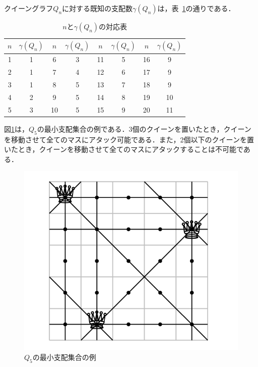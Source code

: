 クイーングラフ$Q_n$に対する既知の支配数$\gamma(Q_n)$は，表~\ref{tb:queen_n}の通りである．
\begin{table}[hbtp]
   \centering
   \label{tb:queen_n}
   \caption{$n$と$\gamma(Q_n)$の対応表}
   \begin{tabular}{|c|c||c|c||c|c||c|c|} \hline
    $n$ & $\gamma(Q_{n})$ & $n$ & $\gamma(Q_{n})$ &$n$ & $\gamma(Q_{n})$ &$n$ & $\gamma(Q_{n})$ \\ \hline \hline
    1 &1 &6 &3 &11 &5 &16 &9 \\ \hline
    2 &1 &7 &4 &12 &6 &17 &9 \\ \hline
    3 &1 &8 &5 &13 &7 &18 &9 \\ \hline
    4 &2 &9 &5 &14 &8 &19 &10 \\ \hline
    5 &3 &10 &5 &15 &9 &20 &11 \\ \hline
   \end{tabular}
  \end{table}

図\ref{ex:queengraph5}は，$Q_5$の最小支配集合の例である．3個のクイーンを置いたとき，クイーンを移動させて全てのマスにアタック可能である．また，2個以下のクイーンを置いたとき，クイーンを移動させて全てのマスにアタックすることは不可能である．
\begin{figure}[htb]
  \centering
  \includegraphics[width=0.6 \linewidth]{fig/fig-queen_5.pdf}
  \caption{$Q_5$の最小支配集合の例}
  \label{ex:queengraph5}
\end{figure}

